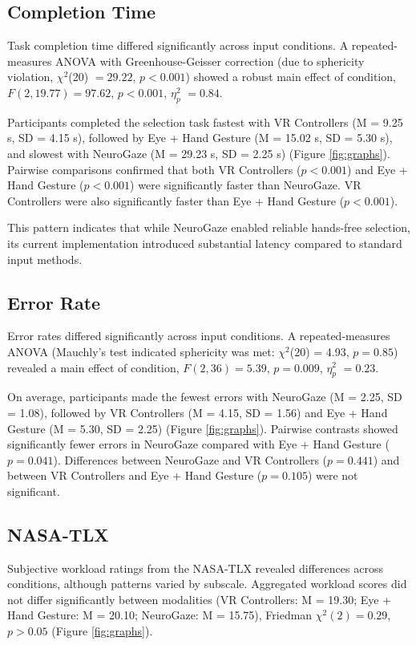 \documentclass[utf8]{FrontiersinHarvard} %
\begin{document}
\subsection{Completion Time}
Task completion time differed significantly across input conditions. A repeated-measures ANOVA with Greenhouse-Geisser correction (due to sphericity violation, $\chi^2$(20) $= 29.22$, $p < 0.001$) showed a robust main effect of condition, $F(2, 19.77) = 97.62$, $p < 0.001$, $\eta_p^2$ $= 0.84$.

Participants completed the selection task fastest with VR Controllers (M = 9.25 s, SD = 4.15 s), followed by Eye + Hand Gesture (M = 15.02 s, SD = 5.30 s), and slowest with NeuroGaze (M = 29.23 s, SD = 2.25 s) (Figure \ref{fig:graphs}). Pairwise comparisons confirmed that both VR Controllers ($p < 0.001$) and Eye + Hand Gesture ($p < 0.001$) were significantly faster than NeuroGaze. VR Controllers were also significantly faster than Eye + Hand Gesture ($p < 0.001$).

This pattern indicates that while NeuroGaze enabled reliable hands-free selection, its current implementation introduced substantial latency compared to standard input methods. 


\subsection{Error Rate}
Error rates differed significantly across input conditions. A repeated-measures ANOVA (Mauchly's test indicated sphericity was met: $\chi^2$(20) = 4.93, $p = 0.85$) revealed a main effect of condition, $F(2, 36) = 5.39$, $p = 0.009$, $\eta_p^2$ $= 0.23$.

On average, participants made the fewest errors with NeuroGaze (M = 2.25, SD = 1.08), followed by VR Controllers (M = 4.15, SD = 1.56) and Eye + Hand Gesture (M = 5.30, SD = 2.25) (Figure \ref{fig:graphs}). Pairwise contrasts showed significantly fewer errors in NeuroGaze compared with Eye + Hand Gesture ($p = 0.041$). Differences between NeuroGaze and VR Controllers ($p = 0.441$) and between VR Controllers and Eye + Hand Gesture ($p = 0.105$) were not significant.


\subsection{NASA-TLX}
Subjective workload ratings from the NASA-TLX revealed differences across conditions, although patterns varied by subscale. Aggregated workload scores did not differ significantly between modalities (VR Controllers: M = 19.30; Eye + Hand Gesture: M = 20.10; NeuroGaze: M = 15.75), Friedman $\chi^{2}(2) = 0.29$, $p > 0.05$ (Figure \ref{fig:graphs}).
\end{document}
